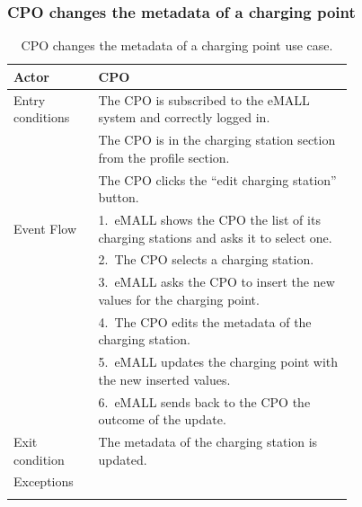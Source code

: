 \subsubsection*{CPO changes the metadata of a charging point}
\begin{center}
    \begin{longtable}{lp{0.75\linewidth}}
        \hline
        Actor            & CPO                                                                                  \\
        \hline
        Entry conditions & The CPO is subscribed to the eMALL system and correctly logged in.                   \\
        & The CPO is in the charging station section from the profile section.                 \\
        & The CPO clicks the “edit charging station” button.                                   \\
        \hline
        Event Flow       & 1.\ eMALL shows the CPO the list of its charging stations and asks it to select one. \\
        & 2.\ The CPO selects a charging station.                                              \\
        & 3.\ eMALL asks the CPO to insert the new values for the charging point.              \\
        & 4.\ The CPO edits the metadata of the charging station.                              \\
        & 5.\ eMALL updates the charging point with the new inserted values.                   \\
        & 6.\ eMALL sends back to the CPO the outcome of the update.                           \\
        \hline
        Exit condition   & The metadata of the charging station is updated.                                     \\
        \hline
        Exceptions       &                                                                                      \\
        \hline
        \caption{CPO changes the metadata of a charging point use case.}
        \label{tab: CPO_updates_charging_point_use_case}
    \end{longtable}
\end{center}

